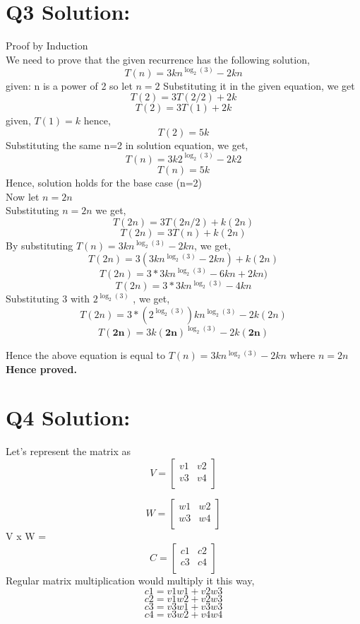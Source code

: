 \documentclass[12pt, a4paper]{article}
\begin{document}
\section*{Q3 Solution:}
Proof by Induction
\\We need to prove that the given recurrence has the following solution, $$ T(n) = 3 kn^{\log_{2}(3)} - 2kn $$
given: n is a power of 2 so let $ n = 2 $
Substituting it in the given equation, we get $$ T(2) = 3T(2/2) + 2k $$
$$ T(2) = 3T(1) + 2k $$ given, $T(1) = k$ hence, $$ T(2) = 5k $$
Substituting the same n=2 in solution equation, we get, $$T(n) = 3k 2^{\log_{2}(3)} - 2k2 $$
$$ T(n) = 5k$$
Hence, solution holds for the base case (n=2)
\\Now let $n = 2n$
\\Substituting $n = 2n$ we get,
$$ T(2n) = 3T(2n/2) + k(2n) $$
$$ T(2n) = 3T(n) + k(2n) $$
By substituting $ T(n) = 3 kn^{\log_{2}(3)} - 2kn $, we get, 
$$ T(2n) = 3(3 kn^{\log_{2}(3)} - 2kn) + k(2n) $$
$$ T(2n) = 3 * 3 kn^{\log_{2}(3)} - 6kn + 2kn) $$
$$ T(2n) = 3 * 3 kn^{\log_{2}(3)} - 4kn $$
Substituting 3 with $2^{\log_{2}(3)}$ , we get,
$$ T(2n) = 3 * (2^{\log_{2}(3)}) kn^{\log_{2}(3)} - 2k(2n) $$
$$ T(\bm{2n}) = 3k (\bm{2n})^{\log_{2}(3)} - 2k(\bm{2n}) $$


Hence the above equation is equal to $ T(n) = 3 kn^{\log_{2}(3)} - 2kn $ where $n = 2n$
\\\textbf{Hence proved.}




\section*{Q4 Solution:}
Let's represent the matrix as 
 \[
   V=
  \left[ {\begin{array}{cc}
   v1 & v2 \\
   v3 & v4 \\
  \end{array} } \right]
\]

 \[
   W=
  \left[ {\begin{array}{cc}
   w1 & w2 \\
   w3 & w4 \\
  \end{array} } \right]
\]
V x W =  \[
   C=
  \left[ {\begin{array}{cc}
   c1 & c2 \\
   c3 & c4 \\
  \end{array} } \right]
\]
Regular matrix multiplication would multiply it this way, 
$$c1 = v1w1+v2w3$$
$$c2 = v1w2+v2w3$$
$$c3 = v3w1+v3w3$$
$$c4 = v3w2+v4w4$$
\end{document}
